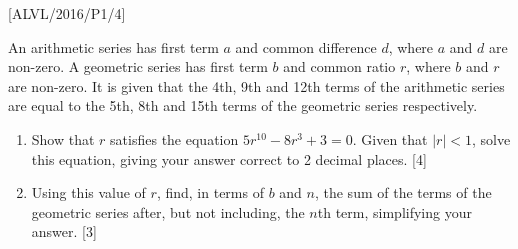 \item {[}ALVL/2016/P1/4{]}

An arithmetic series has first term $a$ and common difference $d$,
where $a$ and $d$ are non-zero. A geometric series has first term
$b$ and common ratio $r$, where $b$ and $r$ are non-zero. It is
given that the 4th, 9th and 12th terms of the arithmetic series are
equal to the 5th, 8th and 15th terms of the geometric series respectively. 
\begin{enumerate}
\item Show that $r$ satisfies the equation $5r^{10}-8r^{3}+3=0$. Given
that $\left|r\right|<1$, solve this equation, giving your answer
correct to 2 decimal places. \hfill{} {[}4{]}
\item Using this value of $r$, find, in terms of $b$ and $n$, the sum
of the terms of the geometric series after, but not including, the
$n$th term, simplifying your answer. \hfill{} {[}3{]}
\end{enumerate}
